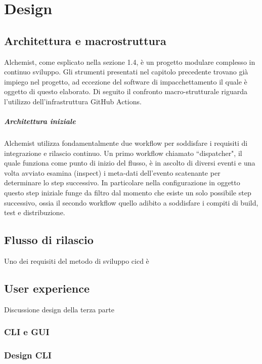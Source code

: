 \chapter{Design}

\section{Architettura e macrostruttura}

Alchemist, come esplicato nella sezione 1.4, è un progetto modulare complesso in continuo sviluppo. Gli strumenti presentati nel capitolo precedente trovano già impiego nel progetto, ad eccezione del software di impacchettamento il quale è oggetto di questo elaborato. Di seguito il confronto macro-strutturale riguarda l'utilizzo dell'infrastruttura GitHub Actions.
\paragraph{Architettura iniziale} Alchemist utilizza fondamentalmente due workflow per soddisfare i requisiti di integrazione e rilascio continuo. Un primo workflow chiamato ``dispatcher", il quale funziona come punto di inizio del flusso, è in ascolto di diversi eventi e una volta avviato esamina (inspect) i meta-dati dell'evento scatenante per determinare lo step successivo. In particolare nella configurazione in oggetto questo step iniziale funge da filtro dal momento che esiste un solo possibile step successivo, ossia il secondo workflow quello adibito a soddisfare i compiti di build, test e distribuzione.

\paragraph{}
\section{Flusso di rilascio}
Uno dei requisiti del metodo di sviluppo \ac{cicd} è 


\section{User experience}
Discussione design della terza parte

\subsection{CLI e GUI}

\subsection{Design CLI}
